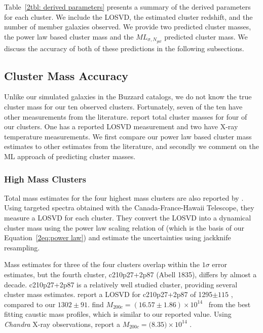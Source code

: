 Table~\ref{2tbl: derived parameters} presents a summary of the derived parameters for each cluster. We include the LOSVD, the estimated cluster redshift, and the number of member galaxies observed. We provide two predicted cluster masses, the power law based cluster mass and the $ML_{\sigma, N_{gal}}$ predicted cluster mass. We discuss the accuracy of both of these predictions in the following subsections.

\subsection{Cluster Mass Accuracy}
Unlike our simulated galaxies in the Buzzard catalogs, we do not know the true cluster mass for our ten observed clusters. Fortunately, seven of the ten have other measurements from the literature. \cite{Sifon2015} report total cluster masses for four of our clusters. One has a reported LOSVD measurement and two have X-ray temperature measurements. We first compare our power law based cluster mass estimates to other estimates from the literature, and secondly we comment on the ML approach of predicting cluster masses.

\subsubsection{High Mass Clusters}
Total mass estimates for the four highest mass clusters are also reported by \cite{Sifon2015}. Using targeted spectra obtained with the Canada-France-Hawaii Telescope, they measure a LOSVD for each cluster. They convert the LOSVD into a dynamical cluster mass using the power law scaling relation of \cite{Evrard2008} (which is the basis of our Equation~\ref{2eq:power law}) and estimate the uncertainties using jackknife resampling. 

Mass estimates for three of the four clusters overlap within the $1\sigma$ error estimates, but the fourth cluster, c210p27+2p87 (Abell 1835), differs by almost a decade. c210p27+2p87 is a relatively well studied cluster, providing several cluster mass estimates. \cite{Hoekstra2012} report a LOSVD for c210p27+2p87 of 1295$\pm{115}$ \kms, compared to our $1302\pm91 $\kms. \cite{Geller2013} find $M_{200c} = (16.57\pm1.86)\times 10^{14}$ \Msol\ from the best fitting caustic mass profiles, which is similar to our reported value. Using \emph{Chandra} X-ray observations, \cite{Bonamente2012} report a $M_{200c} = (8.35$$)\times 10^{14}$ \Msol.

